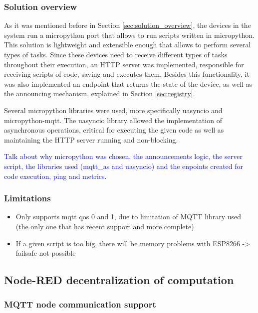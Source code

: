 \subsubsection{Solution overview}

As it was mentioned before in Section \ref{sec:solution_overview}, the devices in the system run a micropython port that allows to run scripts written in micropython. This solution is lightweight and extensible enough that allows to perform several types of tasks. Since these devices need to receive different types of tasks throughout their execution, an HTTP server was implemented, responsible for receiving scripts of code, saving and executes them. Besides this functionality, it was also implemented an endpoint that returns the state of the device, as well as the announcing mechanism, explained in Section \ref{sec:registry}.

Several micropython libraries were used, more specifically uasyncio and micropython-mqtt. The uasyncio library allowed the implementation of asynchronous operations, critical for executing the given code as well as maintaining the HTTP server running and non-blocking.


\textcolor{blue}{Talk about why micropython was chosen, the announcements logic, the server script, the libraries used (mqtt\_as and uasyncio) and the enpoints created for code execution, ping and metrics.}

\subsubsection{Limitations}

\begin{itemize}
    \item Only supports mqtt qos 0 and 1, due to limitation of MQTT library used (the only one that has recent support and more complete)
    \item If a given script is too big, there will be memory problems with ESP8266 -> failsafe not possible
\end{itemize}

\subsection{Node-RED decentralization of computation}\label{sec:node_red_decentralization}

\subsubsection{MQTT node communication support}\label{sec:mqtt_support}

